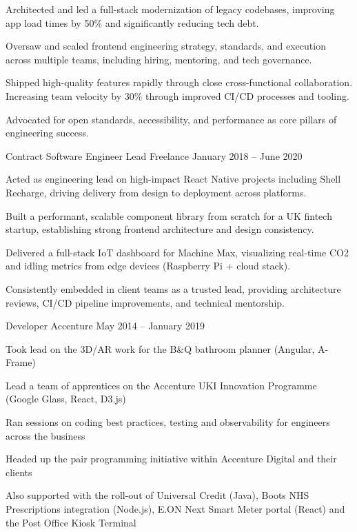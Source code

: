 \documentclass[]{resume-format}
\begin{document}
\begin{cventries}
{\begin{cvitems}
        \item { Architected and led a full-stack modernization of legacy codebases, improving app load times by 50\% and significantly reducing tech debt. }
        \item { Oversaw and scaled frontend engineering strategy, standards, and execution across multiple teams, including hiring, mentoring, and tech governance. }
        \item { Shipped high-quality features rapidly through close cross-functional collaboration. Increasing team velocity by 30\% through improved CI/CD processes and tooling. }
        \item { Advocated for open standards, accessibility, and performance as core pillars of engineering success. }
    \end{cvitems}}
    \cventry
    { Contract Software Engineer Lead }
    { Freelance }
    {}
    { January 2018 – June 2020 }
    {\begin{cvitems}
        \item { Acted as engineering lead on high-impact React Native projects including Shell Recharge, driving delivery from design to deployment across platforms. }
        \item { Built a performant, scalable component library from scratch for a UK fintech startup, establishing strong frontend architecture and design consistency. }
        \item { Delivered a full-stack IoT dashboard for Machine Max, visualizing real-time CO2 and idling metrics from edge devices (Raspberry Pi + cloud stack). }
        \item { Consistently embedded in client teams as a trusted lead, providing architecture reviews, CI/CD pipeline improvements, and technical mentorship. }
    \end{cvitems}}
    \cventry
    { Developer }
    { Accenture }
    {}
    { May 2014 – January 2019 }
    {\begin{cvitems}
        \item { Took lead on the 3D/AR work for the B\&Q bathroom planner (Angular, A-Frame) }
        \item { Lead a team of apprentices on the Accenture UKI Innovation Programme (Google Glass, React, D3.js) }
        \item { Ran sessions on coding best practices, testing and observability for engineers across the business }
        \item { Headed up the pair programming initiative within Accenture Digital and their clients }
        \item { Also supported with the roll-out of Universal Credit (Java), Boots NHS Prescriptions integration (Node.js), E.ON Next Smart Meter portal (React) and the Post Office Kiosk Terminal }
    \end{cvitems}}
\end{cventries}
\end{document}

